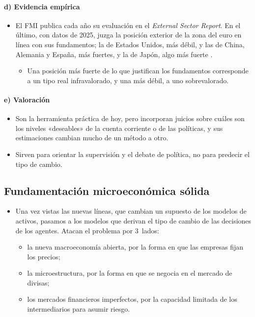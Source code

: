 \documentclass[11pt]{article}
\begin{document}
\paragraph{d) Evidencia empírica}
\begin{itemize}
\item El FMI publica cada año su evaluación en el \emph{External Sector Report}. En el último, con datos de 2025, juzga la posición exterior de la zona del euro en línea con sus fundamentos; la de Estados Unidos, más débil, y las de China, Alemania y España, más fuertes, y la de Japón, algo más fuerte\nocite{FMI2026ESR}   .
  \begin{itemize}
  \item Una posición más fuerte de lo que justifican los fundamentos corresponde a un tipo real infravalorado, y una más débil, a uno sobrevalorado.
  \end{itemize}
\end{itemize}

\paragraph{e) Valoración}
\begin{itemize}
\item Son la herramienta práctica de hoy, pero incorporan juicios sobre cuáles son los niveles «deseables» de la cuenta corriente o de las políticas, y sus estimaciones cambian mucho de un método a otro.
\item Sirven para orientar la supervisión y el debate de política, no para predecir el tipo de cambio.
\end{itemize}

\subsection{Fundamentación microeconómica sólida}\label{sec:micro}

\begin{itemize}
\item Una vez vistas las nuevas líneas, que cambian un supuesto de los modelos de activos, pasamos a los modelos que derivan el tipo de cambio de las decisiones de los agentes. Atacan el problema por 3~lados:
  \begin{itemize}
  \item la nueva macroeconomía abierta, por la forma en que las empresas fijan los precios;
  \item la microestructura, por la forma en que se negocia en el mercado de divisas;
  \item los mercados financieros imperfectos, por la capacidad limitada de los intermediarios para asumir riesgo.
  \end{itemize}
\end{itemize}
\end{document}
